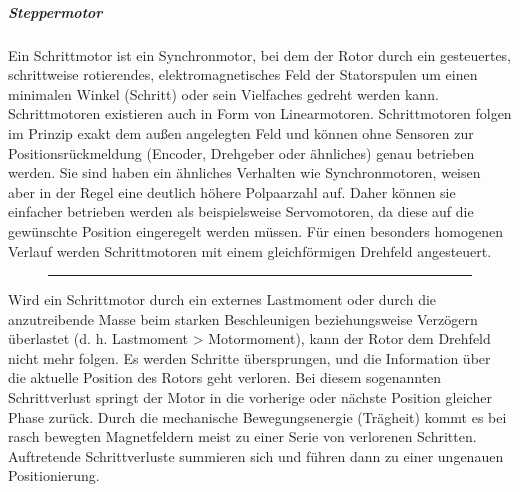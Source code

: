 					\subparagraph{Steppermotor}
						\begin{description}[leftmargin=3cm]
							\item[Allgemein]
							Ein Schrittmotor ist ein Synchronmotor, bei dem der Rotor  durch ein gesteuertes, schrittweise rotierendes, elektromagnetisches Feld der Statorspulen um einen minimalen Winkel (Schritt) oder sein Vielfaches gedreht werden kann. Schrittmotoren existieren auch in Form von Linearmotoren. Schrittmotoren folgen im Prinzip exakt dem außen angelegten Feld und können ohne Sensoren zur Positionsrückmeldung (Encoder, Drehgeber oder ähnliches) genau betrieben werden. Sie sind haben ein ähnliches Verhalten wie Synchronmotoren, weisen aber in der Regel eine deutlich höhere Polpaarzahl auf. Daher können sie einfacher betrieben werden als beispielsweise Servomotoren, da diese auf die gewünschte Position eingeregelt werden müssen. Für einen besonders homogenen Verlauf werden Schrittmotoren mit einem gleichförmigen Drehfeld angesteuert.
							\begin{figure}[h]
								\centering \rule{2.5cm}{0cm}
								 \hspace{0.4cm}
							\end{figure}	
							
							\item[Schrittverlust] 
							Wird ein Schrittmotor durch ein externes Lastmoment oder durch die anzutreibende Masse beim starken Beschleunigen beziehungsweise Verzögern überlastet (d. h. Lastmoment > Motormoment), kann der Rotor dem Drehfeld nicht mehr folgen. Es werden Schritte übersprungen, und die Information über die aktuelle Position des Rotors geht verloren. Bei diesem sogenannten Schrittverlust springt der Motor in die vorherige oder nächste Position gleicher Phase zurück. Durch die mechanische Bewegungsenergie (Trägheit) kommt es bei rasch bewegten Magnetfeldern meist zu einer Serie von verlorenen Schritten. Auftretende Schrittverluste summieren sich und führen dann zu einer ungenauen Positionierung.
							

\end{description}
